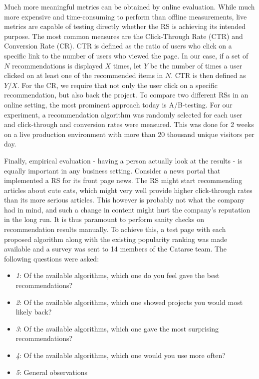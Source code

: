 \documentclass[cic,tc,english]{iiufrgs}
\begin{document}
Much more meaningful metrics can be obtained by online evaluation. While much more expensive and time-consuming to perform than offline measurements, live metrics are capable of testing directly whether the RS is achieving its intended purpose. The most common measures are the Click-Through Rate (CTR) and Conversion Rate (CR). CTR is defined as the ratio of users who click on a specific link to the number of users who viewed the page. In our case, if a set of $N$ recommendations is displayed $X$ times, let $Y$ be the number of times a user clicked on at least one of the recommended items in $N$. CTR is then defined as $Y/X$. For the CR, we require that not only the user click on a specific recommendation, but also back the project. To compare two different RSs in an online setting, the most prominent approach today is A/B-testing. For our experiment, a recommendation algorithm was randomly selected for each user and click-through and conversion rates were measured. This was done for 2 weeks on a live production environment with more than 20 thousand unique visitors per day.

Finally, empirical evaluation - having a person actually look at the results - is equally important in any business setting. Consider a news portal that implemented a RS for its front page news. The RS might start recommending articles about cute cats, which might very well provide higher click-through rates than its more serious articles. This however is probably not what the company had in mind, and such a change in content might hurt the company's reputation in the long run. It is thus paramount to perform sanity checks on recommendation results manually. To achieve this, a test page with each proposed algorithm along with the existing popularity ranking was made available and a survey was sent to 14 members of the Catarse team. The following questions were asked:

\begin{itemize}
    \item \emph{1}: Of the available algorithms, which one do you feel gave the best recommendations?
    \item \emph{2}: Of the available algorithms, which one showed projects you would most likely back?
    \item \emph{3}: Of the available algorithms, which one gave the most surprising recommendations?
    \item \emph{4}: Of the available algorithms, which one would you use more often?
    \item \emph{5}: General observations
\end{itemize}
\end{document}
